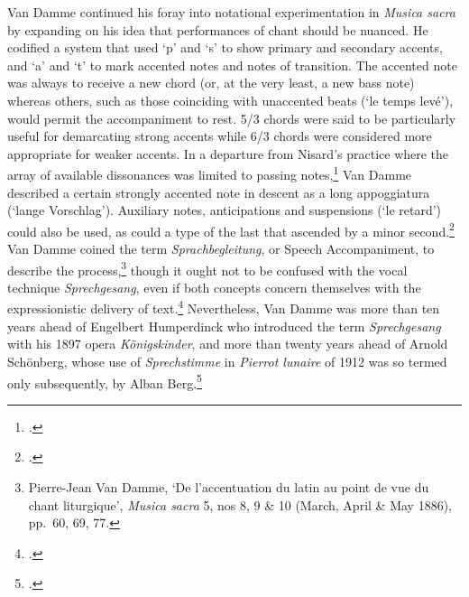 Van Damme continued his foray into notational experimentation in \emph{Musica sacra} by expanding on his idea that performances of chant should be nuanced.
He codified a system that used `p' and `s' to show primary and secondary accents,\nocite{VanDammeaccentuationlatinau1886b} and `a' and `t' to mark accented notes and notes of transition.
The accented note was always to receive a new chord (or, at the very least, a new bass note) whereas others, such as those coinciding with unaccented beats (`le temps levé'), would permit the accompaniment to rest.
5/3 chords were said to be particularly useful for demarcating strong accents while 6/3 chords were considered more appropriate for weaker accents.
\nocite{VanDammeaccentuationlatinau1886a}
In a departure from Nisard's practice where the array of available dissonances was limited to passing notes,\footcite[37]{Nisardvraisprincipesaccompagnement1860} Van Damme described a certain strongly accented note in descent as a long appoggiatura (`lange Vorschlag').
Auxiliary notes, anticipations and suspensions (`le retard') could also be used, as could a type of the last that ascended by a minor second.\footcite[75--7]{VanDammeaccentuationlatinau1886}
Van Damme coined the term \emph{Sprachbegleitung}, or Speech Accompaniment, to describe the process,\footnote{Pierre-Jean Van Damme, `De l'accentuation du latin au point de vue du chant liturgique', \emph{Musica sacra} 5, nos 8, 9 \& 10 (March, April \& May 1886), pp.~60, 69, 77.}\nocite{VanDammeaccentuationlatinau1886} though it ought not to be confused with the vocal technique \emph{Sprechgesang}, even if both concepts concern themselves with the expressionistic delivery of text.\footcite[229]{KnustRichardWagnerCreative2015}
Nevertheless, Van Damme was more than ten years ahead of Engelbert Humperdinck who introduced the term \emph{Sprechgesang} with his 1897 opera \emph{Königskinder}, and more than twenty years ahead of Arnold Schönberg, whose use of \emph{Sprechstimme} in \emph{Pierrot lunaire} of 1912 was so termed only subsequently, by Alban Berg.\footcite{GriffithsSprechgesang}

